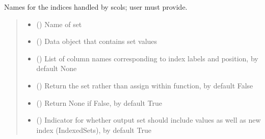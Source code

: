 \documentclass[letterpaper,10pt,english]{sphinxmanual}
\begin{document}
\begin{fulllineitems}
\begin{fulllineitems}
\sphinxAtStartPar
Names for the indices handled by scols; user must provide.
\begin{quote}\begin{description}
\begin{itemize}
\item {} 
\sphinxAtStartPar
{} () \textendash{} Name of set

\item {} 
\sphinxAtStartPar
{} () \textendash{} Data object that contains set values

\item {} 
\sphinxAtStartPar
{} (\sphinxstyleliteralemphasis{\sphinxupquote{ | }}\sphinxstyleliteralemphasis{\sphinxupquote{, }}) \textendash{} List of column names corresponding to index labels and position, by default None

\item {} 
\sphinxAtStartPar
{} (\sphinxstyleliteralemphasis{\sphinxupquote{ | }}\sphinxstyleliteralemphasis{\sphinxupquote{, }}) \textendash{} Return the set rather than assign within function, by default False

\item {} 
\sphinxAtStartPar
{} (\sphinxstyleliteralemphasis{\sphinxupquote{ | }}\sphinxstyleliteralemphasis{\sphinxupquote{, }}) \textendash{} Return None if False, by default True

\item {} 
\sphinxAtStartPar
{} (\sphinxstyleliteralemphasis{\sphinxupquote{ | }}\sphinxstyleliteralemphasis{\sphinxupquote{, }}) \textendash{} Indicator for whether output set should include values as well as new index (IndexedSets), by default True


\end{itemize}
\end{description}
\end{quote}
\end{fulllineitems}
\end{fulllineitems}
\end{document}
